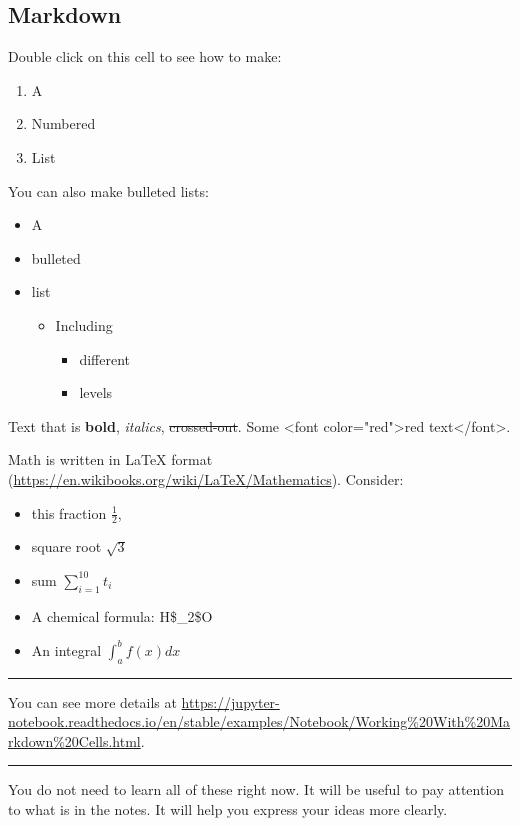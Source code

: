 \documentclass[11pt]{article}
\begin{document}
\subsection{Markdown}
\label{sec:org1963a78}

Double click on this cell to see how to make:
\begin{enumerate}
\item A
\item Numbered
\item List
\end{enumerate}

You can also make bulleted lists:

\begin{itemize}
\item A
\item bulleted
\item list
\begin{itemize}
\item Including
\begin{itemize}
\item different
\item levels
\end{itemize}
\end{itemize}
\end{itemize}

Text that is \textbf{bold}, \emph{italics}, \sout{crossed-out}. Some <font color="red">red text</font>.

Math is written in \LaTeX{} format (\url{https://en.wikibooks.org/wiki/LaTeX/Mathematics}). Consider:
\begin{itemize}
\item this fraction \(\frac{1}{2}\),
\item square root \(\sqrt{3}\)
\item sum \(\sum_{i=1}^{10} t_i\)
\item A chemical formula: H\$\_2\$O
\item An integral \(\int_a^b f(x)dx\)
\end{itemize}

\noindent\rule{\textwidth}{0.5pt}

You can see more details at \url{https://jupyter-notebook.readthedocs.io/en/stable/examples/Notebook/Working\%20With\%20Markdown\%20Cells.html}.

\noindent\rule{\textwidth}{0.5pt}

You do not need to learn all of these right now. It will be useful to pay attention to what is in the notes. It will help you express your ideas more clearly.
\end{document}
